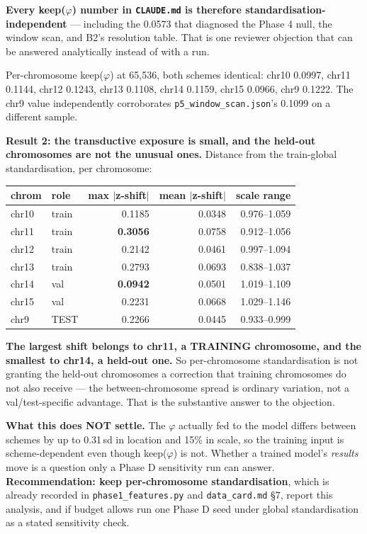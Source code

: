 \documentclass[11pt,a4paper]{article}
\newcommand{\code}[1]{\texttt{\small #1}}
\begin{document}
\textbf{Every keep($\varphi$) number in \code{CLAUDE.md} is therefore
standardisation-independent} --- including the 0.0573 that diagnosed the Phase 4
null, the window scan, and B2's resolution table. That is one reviewer objection
that can be answered analytically instead of with a run.

Per-chromosome keep($\varphi$) at 65{,}536, both schemes identical: chr10 0.0997,
chr11 0.1144, chr12 0.1243, chr13 0.1108, chr14 0.1159, chr15 0.0966,
chr9 0.1222. The chr9 value independently corroborates
\code{p5\_window\_scan.json}'s 0.1099 on a different sample.

\textbf{Result 2: the transductive exposure is small, and the held-out
chromosomes are not the unusual ones.} Distance from the train-global
standardisation, per chromosome:

\begin{center}
\begin{tabular}{llrrr}
\hline
chrom & role & max $|$z-shift$|$ & mean $|$z-shift$|$ & scale range \\
\hline
chr10 & train & 0.1185 & 0.0348 & 0.976--1.059 \\
chr11 & train & \textbf{0.3056} & 0.0758 & 0.912--1.056 \\
chr12 & train & 0.2142 & 0.0461 & 0.997--1.094 \\
chr13 & train & 0.2793 & 0.0693 & 0.838--1.037 \\
chr14 & val & \textbf{0.0942} & 0.0501 & 1.019--1.109 \\
chr15 & val & 0.2231 & 0.0668 & 1.029--1.146 \\
chr9 & TEST & 0.2266 & 0.0445 & 0.933--0.999 \\
\hline
\end{tabular}
\end{center}

\textbf{The largest shift belongs to chr11, a TRAINING chromosome, and the
smallest to chr14, a held-out one.} So per-chromosome standardisation is not
granting the held-out chromosomes a correction that training chromosomes do not
also receive --- the between-chromosome spread is ordinary variation, not a
val/test-specific advantage. That is the substantive answer to the objection.

\textbf{What this does NOT settle.} The $\varphi$ actually fed to the model
differs between schemes by up to 0.31\,sd in location and 15\% in scale, so the
training input is scheme-dependent even though keep($\varphi$) is not. Whether a
trained model's \emph{results} move is a question only a Phase D sensitivity run
can answer. \textbf{Recommendation: keep per-chromosome standardisation}, which
is already recorded in \code{phase1\_features.py} and \code{data\_card.md} \S7,
report this analysis, and if budget allows run one Phase D seed under global
standardisation as a stated sensitivity check.
\end{document}

